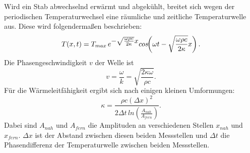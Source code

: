 \noindent Wird ein Stab abwechselnd erwärmt und abgekühlt, breitet sich wegen der periodischen Temperaturwechsel eine räumliche 
und zeitliche Temperaturwelle aus. Diese wird folgendermaßen beschrieben:
\begin{equation}
    T(x,t) = T_{max} \,  e^{\mathlarger{-\sqrt{\frac{\omega \rho c}{2 \kappa}} x}} cos\!\!\left(\omega t - \sqrt{\frac{\omega \rho c}{2 \kappa}} x\right).
    \label{eqn:Wellengleichung}
\end{equation}
Die Phasengeschwindigkeit $v$ der Welle ist
\begin{equation}
    v= \frac{\omega}{k} = \sqrt{\frac{2\kappa \omega}{\rho c}}.
    \label{eqn:phasengesch}
\end{equation}
Für die Wärmeleitfähigkeit ergibt sich nach einigen kleinen Umformungen: %
\begin{equation}
    \kappa = \frac{\rho c (\Delta x)^2}{2 \Delta t \, ln\!\!\left(\frac{A_{nah}}{A_{fern}}\right)}.
    \label{eqn:Wärme}
\end{equation}
Dabei sind $A_{nah}$ und $A_{fern}$ die Amplituden an verschiedenen Stellen $x_{nah}$ und $x_{fern}$. $\Delta x$ ist 
der Abstand zwischen diesen beiden Messstellen und $\Delta t$ die Phasendifferenz der Temperaturwelle zwischen beiden 
Messstellen.
